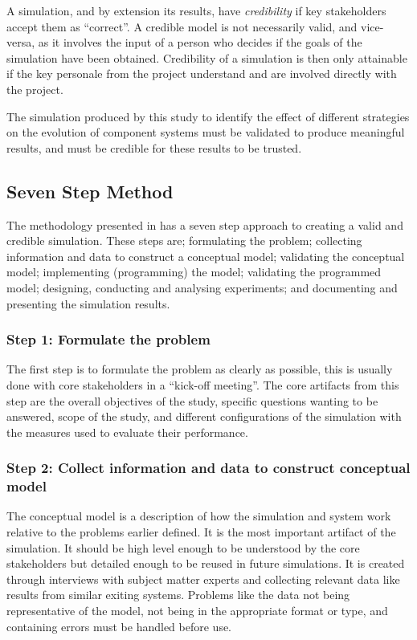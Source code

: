 A simulation, and by extension its results, have \textit{credibility} if key stakeholders accept them as ``correct''.
A credible model is not necessarily valid, and vice-versa, as it involves the input of a person who decides if the goals of the simulation have been obtained.
Credibility of a simulation is then only attainable if the key personale from the project understand and are involved directly with the project.

The simulation produced by this study to identify the effect of different strategies on the evolution of component systems must be validated to produce meaningful results,
and must be credible for these results to be trusted.

\subsection{Seven Step Method}
The methodology presented in \citep{Law2005} has a seven step approach to creating a valid and credible simulation.
These steps are; formulating the problem; collecting information and data to construct a conceptual model; validating the conceptual model;
implementing (programming) the model; validating the programmed model; designing, conducting and analysing experiments; and documenting and presenting the simulation results.

\subsubsection{Step 1: Formulate the problem}
The first step is to formulate the problem as clearly as possible, this is usually done with core stakeholders in a ``kick-off meeting''.
The core artifacts from this step are the overall objectives of the study, specific questions wanting to be answered, scope of the study,
 and different configurations of the simulation with the measures used to evaluate their performance. 

\subsubsection{Step 2: Collect information and data to construct conceptual model}
The conceptual model is a description of how the simulation and system work relative to the problems earlier defined.
It is the most important artifact of the simulation.
It should be high level enough to be understood by the core stakeholders but detailed enough to be reused in future simulations.
It is created through interviews with subject matter experts and collecting relevant data like results from similar exiting systems.
Problems like the data not being representative of the model, not being in the appropriate format or type, and containing errors must be handled before use.

